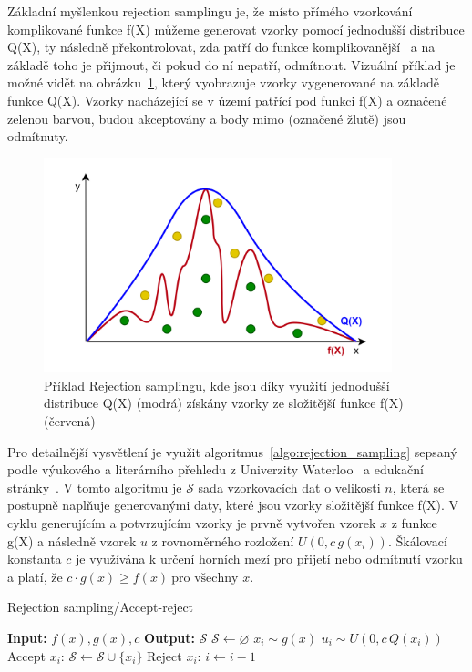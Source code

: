 Základní myšlenkou rejection samplingu je, že místo přímého vzorkování komplikované funkce f(X) můžeme generovat vzorky pomocí jednodušší distribuce Q(X), ty následně překontrolovat, zda patří do funkce komplikovanější~\cite{ghojogh2020sampling} a na základě toho je přijmout, či pokud do ní nepatří, odmítnout. Vizuální příklad je možné vidět na obrázku~\ref{fig:RA_graph}, který vyobrazuje vzorky vygenerované na základě funkce Q(X). Vzorky nacházející se v území patřící pod funkci f(X) a označené zelenou barvou, budou akceptovány a body mimo (označené žlutě) jsou odmítnuty.

\begin{figure}[H]
    \centering
    \includegraphics[width=0.9\textwidth]{obrazky-figures/ch2/RA_graph.png}
    \caption{Příklad Rejection samplingu, kde jsou díky využití jednodušší distribuce Q(X) (modrá) získány vzorky ze složitější funkce f(X) (červená)}
    \label{fig:RA_graph}
\end{figure}

Pro detailnější vysvětlení je využit algoritmus~\ref{algo:rejection_sampling} sepsaný podle výukového a literárního přehledu z Univerzity Waterloo~\cite{ghojogh2020sampling} a edukační stránky~\cite{Sachdeva_2021}. V tomto algoritmu je $\mathcal{S}$ sada vzorkovacích dat o velikosti $n$, která se postupně naplňuje generovanými daty, které jsou vzorky složitější funkce f(X). V cyklu generujícím a potvrzujícím vzorky je prvně vytvořen vzorek $x$ z funkce g(X) a následně vzorek $u$ z rovnoměrného rozložení $U(0, c\, g(x_i))$. Škálovací konstanta $c$ je využívána k určení horních mezí pro přijetí nebo odmítnutí vzorku a platí, že $c \cdot g(x) \geq f(x) \ \text{pro všechny } x$.
\label{eq:RA_c}
\begin{algorithm}[h]
\caption{Rejection sampling/Accept-reject}\label{algo:rejection_sampling}
\begin{algorithmic}[1]
    \State \textbf{Input:} $f(x), g(x), c$\;
    \State \textbf{Output:} $\mathcal{S}$
    \State $\mathcal{S} \gets \varnothing$
        \State $x_i \sim g(x)$
        \State $u_i \sim U(0, c\, Q(x_i))$
            \State Accept $x_i$: $\mathcal{S} \gets \mathcal{S} \cup \{x_i\}$
        \Else
            \State Reject $x_i$: $i \gets i - 1$
        \EndIf
    \EndFor
\end{algorithmic}
\end{algorithm}

